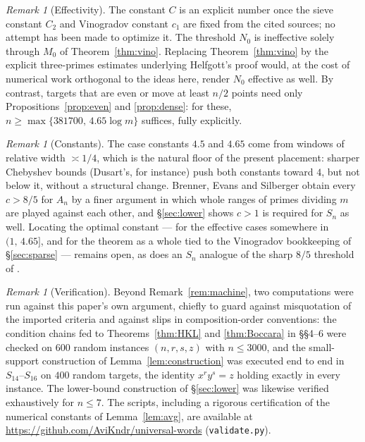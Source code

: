 \documentclass[11pt]{amsart}
\numberwithin{equation}{section}
\theoremstyle{remark}
\newtheorem{remark}[theorem]{Remark}
\begin{document}
\begin{remark}[Effectivity]\label{rem:effective}
The constant $C$ is an explicit number once the sieve constant $C_2$ and
Vinogradov constant $c_1$ are fixed from the cited sources; no attempt has been
made to optimize it. The threshold $N_0$ is ineffective solely through $M_0$ of
Theorem~\ref{thm:vino}. Replacing Theorem~\ref{thm:vino} by the explicit
three-primes estimates underlying Helfgott's proof \cite{Helfgott} would, at the
cost of numerical work orthogonal to the ideas here, render $N_0$ effective as
well. By contrast, targets that are even or move at least $n/2$ points need only
Propositions~\ref{prop:even} and \ref{prop:dense}: for these,
$n\ge\max\{381700,\,4.65\log m\}$ suffices, fully explicitly.
\end{remark}

\begin{remark}[Constants]
The case constants $4.5$ and $4.65$ come from windows of relative width
$\asymp1/4$, which is the natural floor of the present placement: sharper
Chebyshev bounds (Dusart's, for instance) push both constants toward $4$, but
not below it, without a structural change. Brenner, Evans and Silberger
\cite{BES} obtain every $c>8/5$ for $A_n$ by a finer argument in which whole
ranges of primes dividing $m$ are played against each other, and
\S\ref{sec:lower} shows $c>1$ is required for $S_n$ as well. Locating the
optimal constant --- for the effective cases somewhere in $(1,\,4.65]$, and for
the theorem as a whole tied to the Vinogradov bookkeeping of \S\ref{sec:sparse}
--- remains open, as does an $S_n$ analogue of the sharp $8/5$ threshold of
\cite{BES}.
\end{remark}

\begin{remark}[Verification]\label{rem:verification}
Beyond Remark~\ref{rem:machine}, two computations were run against this paper's
own argument, chiefly to guard against misquotation of the imported criteria and
against slips in composition-order conventions: the condition chains fed to
Theorems~\ref{thm:HKL} and \ref{thm:Boccara} in \S\S4--6 were checked on $600$
random instances $(n,r,s,z)$ with $n\le3000$, and the small-support construction
of Lemma~\ref{lem:construction} was executed end to end in $S_{14}$--$S_{16}$ on
$400$ random targets, the identity $x^ry^s=z$ holding exactly in every instance.
The lower-bound construction of \S\ref{sec:lower} was likewise verified
exhaustively for $n\le7$. The scripts, including a rigorous certification of the
numerical constants of Lemma~\ref{lem:avg}, are available at
\url{https://github.com/AviKndr/universal-words} (\texttt{validate.py}).
\end{remark}
\end{document}
